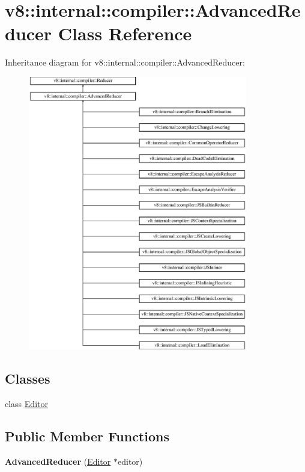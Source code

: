 \hypertarget{classv8_1_1internal_1_1compiler_1_1_advanced_reducer}{}\section{v8\+:\+:internal\+:\+:compiler\+:\+:Advanced\+Reducer Class Reference}
\label{classv8_1_1internal_1_1compiler_1_1_advanced_reducer}
Inheritance diagram for v8\+:\+:internal\+:\+:compiler\+:\+:Advanced\+Reducer\+:\begin{figure}[H]
\begin{center}
\leavevmode
\includegraphics[height=12.000000cm]{classv8_1_1internal_1_1compiler_1_1_advanced_reducer}
\end{center}
\end{figure}
\subsection*{Classes}
\begin{DoxyCompactItemize}
\item 
class \hyperlink{classv8_1_1internal_1_1compiler_1_1_advanced_reducer_1_1_editor}{Editor}
\end{DoxyCompactItemize}
\subsection*{Public Member Functions}
\begin{DoxyCompactItemize}
\item 
{\bfseries Advanced\+Reducer} (\hyperlink{classv8_1_1internal_1_1compiler_1_1_advanced_reducer_1_1_editor}{Editor} $\ast$editor)\hypertarget{classv8_1_1internal_1_1compiler_1_1_advanced_reducer_abb941b5a245fa4b0c2e87c049fd78190}{}\label{classv8_1_1internal_1_1compiler_1_1_advanced_reducer_abb941b5a245fa4b0c2e87c049fd78190}

\end{DoxyCompactItemize}
